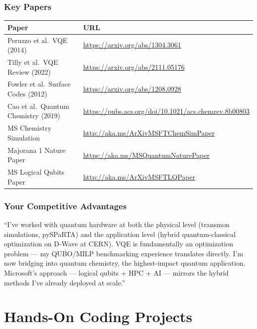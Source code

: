 \documentclass[11pt,a4paper]{article}
\begin{document}
\section*{Key Papers}
\begin{longtable}{p{6cm}p{9cm}}
\toprule
\textbf{Paper} & \textbf{URL} \\
\midrule
Peruzzo et al.\ VQE (2014) & \url{https://arxiv.org/abs/1304.3061} \\
Tilly et al.\ VQE Review (2022) & \url{https://arxiv.org/abs/2111.05176} \\
Fowler et al.\ Surface Codes (2012) & \url{https://arxiv.org/abs/1208.0928} \\
Cao et al.\ Quantum Chemistry (2019) & \url{https://pubs.acs.org/doi/10.1021/acs.chemrev.8b00803} \\
MS Chemistry Simulation & \url{http://aka.ms/ArXivMSFTChemSimPaper} \\
Majorana 1 Nature Paper & \url{https://aka.ms/MSQuantumNaturePaper} \\
MS Logical Qubits Paper & \url{http://aka.ms/ArXivMSFTLQPaper} \\
\bottomrule
\end{longtable}

\section*{Your Competitive Advantages}

\begin{importantbox}
``I've worked with quantum hardware at both the physical level (transmon simulations, pySPaRTA) and the application level (hybrid quantum-classical optimization on D-Wave at CERN). VQE is fundamentally an optimization problem --- my QUBO/MILP benchmarking experience translates directly. I'm now bridging into quantum chemistry, the highest-impact quantum application. Microsoft's approach --- logical qubits + HPC + AI --- mirrors the hybrid methods I've already deployed at scale.''
\end{importantbox}

\newpage
\part{Hands-On Coding Projects}
\label{part:projects}
\end{document}
